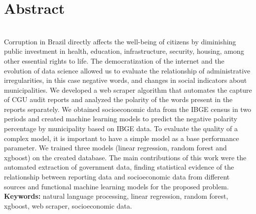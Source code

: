 \documentclass[12pt,twoside,a4paper]{book}
\begin{document}
\chapter*{Abstract}

\\

Corruption in Brazil directly affects the well-being of citizens by diminishing public investment in health, education, infrastructure, security, housing, among other essential rights to life. The democratization of the internet and the evolution of data science allowed us to evaluate the relationship of administrative irregularities, in this case negative words, and changes in social indicators about municipalities. We developed a web scraper algorithm that automates the capture of CGU audit reports and analyzed the polarity of the words present in the reports separately. We obtained socioeconomic data from the IBGE census in two periods and created machine learning models to predict the negative polarity percentage by municipality based on IBGE data. To evaluate the quality of a complex model, it is important to have a simple model as a base performance parameter. We trained three models (linear regression, random forest and xgboost) on the created database. The main contributions of this work were the automated extraction of government data, finding statistical evidence of the relationship between reporting data and socioeconomic data from different sources and functional machine learning models for the proposed problem.
\\

\noindent \textbf{Keywords:} natural language processing, linear regression, random forest, xgboost, web scraper, socioeconomic data.

\tableofcontents    %

\mainmatter

\fancyhead[RE,LO]{\thesection}

\singlespacing              %

\end{document}

